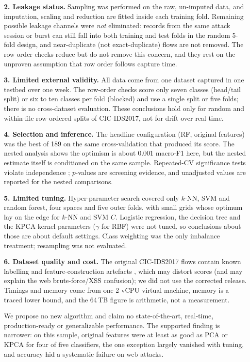 \documentclass[runningheads]{llncs}
\begin{document}
\textbf{2. Leakage status.} Sampling was performed on the raw, un-imputed data, and imputation, scaling and reduction are fitted inside each training fold. Remaining possible leakage channels were \emph{not} eliminated: records from the same attack session or burst can still fall into both training and test folds in the random 5-fold design, and near-duplicate (not exact-duplicate) flows are not removed. The row-order checks reduce but do not remove this concern, and they rest on the unproven assumption that row order follows capture time.

\textbf{3. Limited external validity.} All data come from one dataset captured in one testbed over one week. The row-order checks score only seven classes (head/tail split) or six to ten classes per fold (blocked) and use a single split or five folds; there is no cross-dataset evaluation. These conclusions hold only for random and within-file row-ordered splits of CIC-IDS2017, not for drift over real time.

\textbf{4. Selection and inference.} The headline configuration (RF, original features) was the best of 189 on the same cross-validation that produced its score. The nested analysis shows the optimism is about 0.001 macro-F1 here, but the nested estimate itself is conditioned on the same sample. Repeated-CV significance tests violate independence \cite{nadeau2003}; $p$-values are screening evidence, and unadjusted values are reported for the nested comparisons.

\textbf{5. Limited tuning.} Hyper-parameter search covered only $k$-NN, SVM and random forest, four spaces and five outer folds, with small grids whose optimum lay on the edge for $k$-NN and SVM $C$. Logistic regression, the decision tree and the KPCA kernel parameters ($\gamma$ for RBF) were not tuned, so conclusions about those are about default settings. Class weighting was the only imbalance treatment; resampling was not evaluated.

\textbf{6. Dataset quality and cost.} The original CIC-IDS2017 flows contain known labelling and feature-construction artefacts \cite{engelen2021}, which may distort scores (and may explain the web brute-force/XSS confusion); we did not use the corrected release. Timings and memory come from one 2-vCPU virtual machine, memory is a traced lower bound, and the 64\,TB figure is arithmetic, not a measurement.



We propose no new algorithm and claim no state-of-the-art, real-time, production-ready or generalizable performance. The supported finding is narrower: on this sample, original features were at least as good as PCA or KPCA for four of five classifiers, the one exception largely vanished with tuning, and accuracy hid a systematic failure on web attacks.
\end{document}
